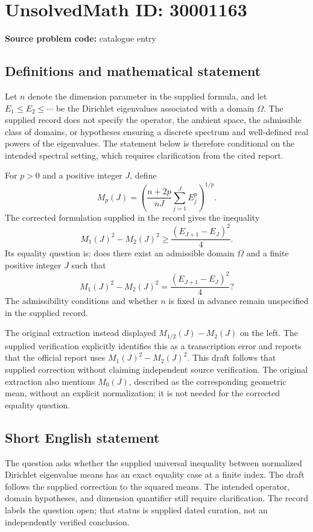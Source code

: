 \documentclass[11pt]{article}
\begin{document}
\section*{UnsolvedMath ID: 30001163}
\textbf{Source problem code:} catalogue entry
\subsection{Definitions and mathematical statement}
Let \(n\) denote the dimension parameter in the supplied formula, and let \(E_1\leq E_2\leq\cdots\) be the Dirichlet eigenvalues associated with a domain \(\Omega\). The supplied record does not specify the operator, the ambient space, the admissible class of domains, or hypotheses ensuring a discrete spectrum and well-defined real powers of the eigenvalues. The statement below is therefore conditional on the intended spectral setting, which requires clarification from the cited report.

For \(p>0\) and a positive integer \(J\), define
\[
M_p(J)=\left(\frac{n+2p}{nJ}\sum_{j=1}^{J}E_j^p\right)^{1/p}.
\]
The corrected formulation supplied in the record gives the inequality
\[
M_1(J)^2-M_2(J)^2\geq\frac{(E_{J+1}-E_J)^2}{4}.
\]
Its equality question is: does there exist an admissible domain \(\Omega\) and a finite positive integer \(J\) such that
\[
M_1(J)^2-M_2(J)^2=\frac{(E_{J+1}-E_J)^2}{4}?
\]
The admissibility conditions and whether \(n\) is fixed in advance remain unspecified in the supplied record.

The original extraction instead displayed \(M_{1/2}(J)-M_2(J)\) on the left. The supplied verification explicitly identifies this as a transcription error and reports that the official report uses \(M_1(J)^2-M_2(J)^2\). This draft follows that supplied correction without claiming independent source verification. The original extraction also mentions \(M_0(J)\), described as the corresponding geometric mean, without an explicit normalization; it is not needed for the corrected equality question.
\subsection{Short English statement}
The question asks whether the supplied universal inequality between normalized Dirichlet eigenvalue means has an exact equality case at a finite index. The draft follows the supplied correction to the squared means. The intended operator, domain hypotheses, and dimension quantifier still require clarification. The record labels the question open; that status is supplied dated curation, not an independently verified conclusion.
\end{document}
